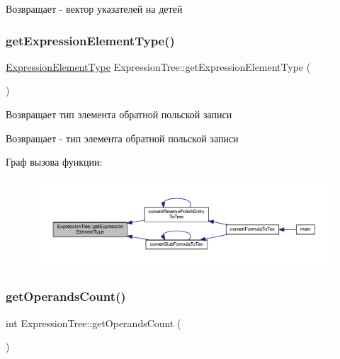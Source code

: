 \begin{DoxyReturn}{Возвращает}
-\/ вектор указателей на детей 
\end{DoxyReturn}
\mbox{\label{class_expression_tree_ab2d6cfdfb645e371d50cc5882053354f}} 
\subsubsection{\texorpdfstring{get\+Expression\+Element\+Type()}{getExpressionElementType()}}
{\footnotesize\ttfamily \mbox{\hyperlink{_expression_tree_8h_a3773a0b5484dde6ff527a03ae3b28b75}{Expression\+Element\+Type}} Expression\+Tree\+::get\+Expression\+Element\+Type (\begin{DoxyParamCaption}{ }\end{DoxyParamCaption})}



Возвращает тип элемента обратной польской записи 

\begin{DoxyReturn}{Возвращает}
-\/ тип элемента обратной польской записи 
\end{DoxyReturn}
Граф вызова функции\+:\nopagebreak
\begin{figure}[H]
\begin{center}
\leavevmode
\includegraphics[width=350pt]{class_expression_tree_ab2d6cfdfb645e371d50cc5882053354f_icgraph}
\end{center}
\end{figure}
\mbox{\label{class_expression_tree_a8b072f45d0e8dbcd9aa7159c10792407}} 
\subsubsection{\texorpdfstring{get\+Operands\+Count()}{getOperandsCount()}}
{\footnotesize\ttfamily int Expression\+Tree\+::get\+Operands\+Count (\begin{DoxyParamCaption}{ }\end{DoxyParamCaption})}



